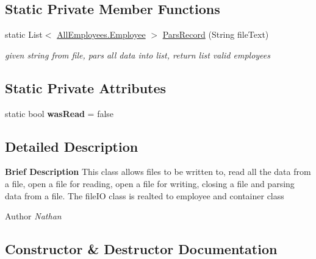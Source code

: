 \subsection*{Static Private Member Functions}
\begin{DoxyCompactItemize}
\item 
static List$<$ \hyperlink{class_all_employees_1_1_employee}{All\+Employees.\+Employee} $>$ \hyperlink{class_supporting_1_1_file_i_o_ab08bc41626341cdcbb83ee47d173ea1a}{Pars\+Record} (String file\+Text)
\begin{DoxyCompactList}\small\item\em given string from file, pars all data into list, return list valid employees \end{DoxyCompactList}\end{DoxyCompactItemize}
\subsection*{Static Private Attributes}
\begin{DoxyCompactItemize}
\item 
\hypertarget{class_supporting_1_1_file_i_o_a8e398ed97d5a04cb711f2b9226b4eb82}{}static bool {\bfseries was\+Read} = false\label{class_supporting_1_1_file_i_o_a8e398ed97d5a04cb711f2b9226b4eb82}

\end{DoxyCompactItemize}


\subsection{Detailed Description}
{\bfseries Brief Description} This class allows files to be written to, read all the data from a file, open a file for reading, open a file for writing, closing a file and parsing data from a file. The file\+I\+O class is realted to employee and container class 

\begin{DoxyAuthor}{Author}
{\itshape Nathan} 
\end{DoxyAuthor}


\subsection{Constructor \& Destructor Documentation}
\hypertarget{class_supporting_1_1_file_i_o_a98bf48b6b28f84aa8cb879fba0ec3869}{}
